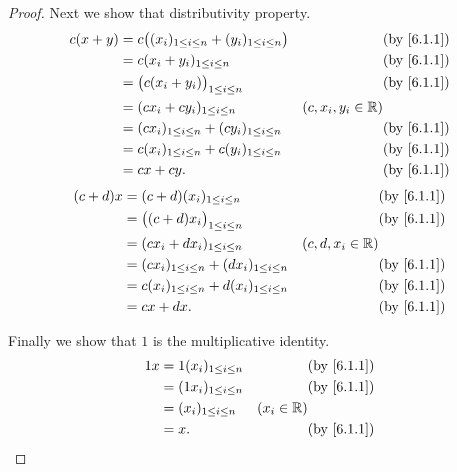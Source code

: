 \begin{proof}
  Next we show that distributivity property.
  \begin{align*}
    c(x + y) & = c\big((x_i)_{1 \leq i \leq n} + (y_i)_{1 \leq i \leq n}\big) &                      & \by{6.1.1} \\
             & = c(x_i + y_i)_{1 \leq i \leq n}                               &                      & \by{6.1.1} \\
             & = \big(c(x_i + y_i)\big)_{1 \leq i \leq n}                     &                      & \by{6.1.1} \\
             & = (c x_i + c y_i)_{1 \leq i \leq n}                            & (c, x_i, y_i \in \R)              \\
             & = (c x_i)_{1 \leq i \leq n} + (c y_i)_{1 \leq i \leq n}        &                      & \by{6.1.1} \\
             & = c(x_i)_{1 \leq i \leq n} + c(y_i)_{1 \leq i \leq n}          &                      & \by{6.1.1} \\
             & = cx + cy.                                                     &                      & \by{6.1.1}
  \end{align*}
  \begin{align*}
    (c + d)x & = (c + d)(x_i)_{1 \leq i \leq n}                        &                    & \by{6.1.1} \\
             & = \big((c + d) x_i\big)_{1 \leq i \leq n}               &                    & \by{6.1.1} \\
             & = (c x_i + d x_i)_{1 \leq i \leq n}                     & (c, d, x_i \in \R)              \\
             & = (c x_i)_{1 \leq i \leq n} + (d x_i)_{1 \leq i \leq n} &                    & \by{6.1.1} \\
             & = c(x_i)_{1 \leq i \leq n} + d(x_i)_{1 \leq i \leq n}   &                    & \by{6.1.1} \\
             & = cx + dx.                                              &                    & \by{6.1.1}
  \end{align*}

  Finally we show that \(1\) is the multiplicative identity.
  \begin{align*}
    1 x & = 1 (x_i)_{1 \leq i \leq n} &              & \by{6.1.1} \\
        & = (1 x_i)_{1 \leq i \leq n} &              & \by{6.1.1} \\
        & = (x_i)_{1 \leq i \leq n}   & (x_i \in \R)              \\
        & = x.                        &              & \by{6.1.1}
  \end{align*}
\end{proof}

